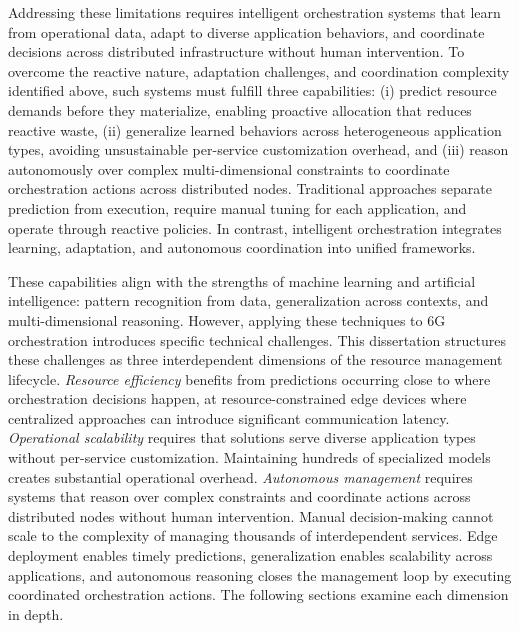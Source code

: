 Addressing these limitations requires intelligent orchestration systems that learn from operational data, adapt to diverse application behaviors, and coordinate decisions across distributed infrastructure without human intervention. To overcome the reactive nature, adaptation challenges, and coordination complexity identified above, such systems must fulfill three capabilities: (i) predict resource demands before they materialize, enabling proactive allocation that reduces reactive waste, (ii) generalize learned behaviors across heterogeneous application types, avoiding unsustainable per-service customization overhead, and (iii) reason autonomously over complex multi-dimensional constraints to coordinate orchestration actions across distributed nodes. Traditional approaches separate prediction from execution, require manual tuning for each application, and operate through reactive policies. In contrast, intelligent orchestration integrates learning, adaptation, and autonomous coordination into unified frameworks.

These capabilities align with the strengths of machine learning and artificial intelligence: pattern recognition from data, generalization across contexts, and multi-dimensional reasoning. However, applying these techniques to \ac{6G} orchestration introduces specific technical challenges. This dissertation structures these challenges as three interdependent dimensions of the resource management lifecycle. \textit{Resource efficiency} benefits from predictions occurring close to where orchestration decisions happen, at resource-constrained edge devices where centralized approaches can introduce significant communication latency. \textit{Operational scalability} requires that solutions serve diverse application types without per-service customization. Maintaining hundreds of specialized models creates substantial operational overhead. \textit{Autonomous management} requires systems that reason over complex constraints and coordinate actions across distributed nodes without human intervention. Manual decision-making cannot scale to the complexity of managing thousands of interdependent services. Edge deployment enables timely predictions, generalization enables scalability across applications, and autonomous reasoning closes the management loop by executing coordinated orchestration actions. The following sections examine each dimension in depth.


